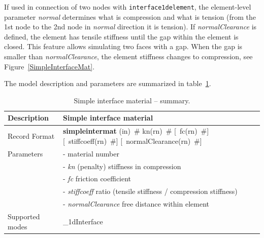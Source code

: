 \documentclass[a4paper]{article}
\newcommand{\descitem}[1]{{\noindent \bf #1}}
\newcommand{\elemparam}[2]{{{#1\tiny (#2)}~\#}}
\newcommand{\optelemparam}[2]{[{~\elemparam{#1}{#2}}]}
\newcommand{\param}[1]{{\it #1}}
\begin{document}
If used in connection of two nodes with {\tt interface1delement}, the element-level parameter \param{normal} determines what is compression and what is tension (from the 1st node to the 2nd node in \param{normal} direction it is tension). If \param{normalClearance} is defined, the element has tensile stiffness until the gap within the element is closed. This feature allows simulating two faces with a gap. When the gap is smaller than \param{normalClearance}, the element stiffness changes to compression, see Figure~\ref{SimpleInterfaceMat}. 

The model description and parameters are summarized in table~\ref{simpleinterfacemat_table}.

\begin{table}[!htb]
\begin{tabular}{|l|p{9cm}|}
\hline
Description & Simple interface material\\
\hline
Record Format & \descitem{simpleintermat}  \elemparam{}{in}
\elemparam{kn}{rn} \optelemparam{fc}{rn} \optelemparam{stiffcoeff}{rn} \optelemparam{normalClearance}{rn}\\
Parameters &- \param{} material number\\
&- \param{kn} (penalty) stiffness in compression\\
&- \param{fc} friction coefficient\\
&- \param{stiffcoeff} ratio (tensile stiffness / compression stiffness)\\
&- \param{normalClearance} free distance within element\\

Supported modes& \_1dInterface\\
\hline
\end{tabular}
\caption{Simple interface material -- summary.}
\label{simpleinterfacemat_table}
\end{table}
\end{document}
